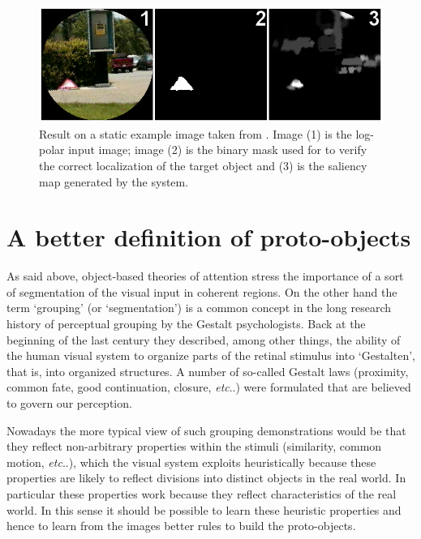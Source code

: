 \documentclass{llncs}
\makeatletter
\DeclareRobustCommand\onedot{\futurelet\@let@token\@onedot}
\def\@onedot{\ifx\@let@token.\else.\null\fi\xspace}
\def\etc{\emph{etc}\onedot} \def\vs{\emph{vs}\onedot}
\makeatother
\begin{document}
\begin{figure}[]
  \begin{center}
    \includegraphics[width=0.9\linewidth]{./figs/attention/itti}
    \caption{Result on a static example image taken from \cite{IttiK01b}.
     Image (1) is the log-polar input image; image (2) is the binary mask used for to verify
     the correct localization of the target object and (3) is the saliency map generated
     by the system.}
    \label{fig:itti_ex}
  \end{center}
\end{figure}


\section{A better definition of proto-objects\label{ass_fields}}


As said above, object-based theories of attention stress the importance
of a sort of segmentation of the visual input in coherent regions.
On the other hand the term `grouping' (or `segmentation')
is a common concept in the long research history of perceptual grouping
by the Gestalt psychologists.
Back at the beginning of the last century they
described, among other things, the ability of the human
visual system to organize parts of the retinal stimulus
into `Gestalten', that is, into organized structures.
A number of so-called Gestalt laws 
(proximity, common fate, good continuation, closure, \etc) were
formulated that are believed to govern our perception.

Nowadays the more typical view of such grouping
demonstrations would be that they reflect non-arbitrary properties within the stimuli
(similarity, common motion, \etc), which the visual system
exploits heuristically because these properties
are likely to reflect divisions into distinct objects in the real world.
In particular these properties work because they reflect characteristics of
the real world. 
In this sense it should be possible to learn these heuristic
properties and hence to learn from the images better rules
to build the proto-objects.
\end{document}
